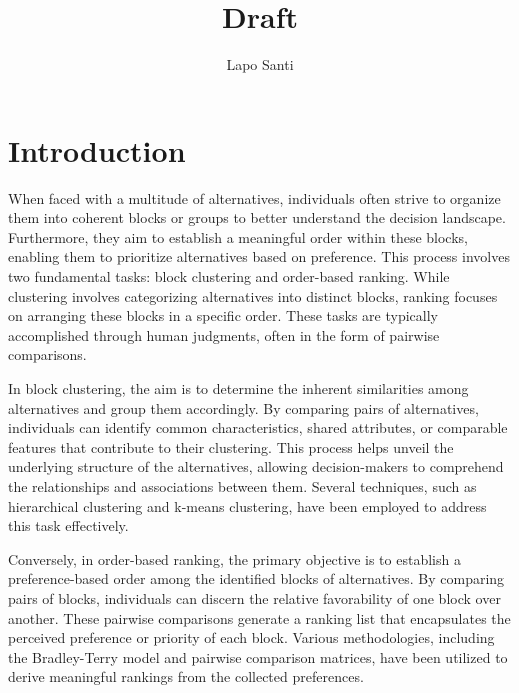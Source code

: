 \documentclass[11pt]{amsart}
\title{Draft}
\author{Lapo Santi}
\begin{document}
\maketitle
\tableofcontents

\newpage

\section{Introduction}



When faced with a multitude of alternatives, individuals often strive to organize them into coherent blocks or groups to better understand the decision landscape. Furthermore, they aim to establish a meaningful order within these blocks, enabling them to prioritize alternatives based on preference. This process involves two fundamental tasks: block clustering and order-based ranking. While clustering involves categorizing alternatives into distinct blocks, ranking focuses on arranging these blocks in a specific order. These tasks are typically accomplished through human judgments, often in the form of pairwise comparisons.

In block clustering, the aim is to determine the inherent similarities among alternatives and group them accordingly. By comparing pairs of alternatives, individuals can identify common characteristics, shared attributes, or comparable features that contribute to their clustering. This process helps unveil the underlying structure of the alternatives, allowing decision-makers to comprehend the relationships and associations between them. Several techniques, such as hierarchical clustering and k-means clustering, have been employed to address this task effectively.

Conversely, in order-based ranking, the primary objective is to establish a preference-based order among the identified blocks of alternatives. By comparing pairs of blocks, individuals can discern the relative favorability of one block over another. These pairwise comparisons generate a ranking list that encapsulates the perceived preference or priority of each block. Various methodologies, including the Bradley-Terry model and pairwise comparison matrices, have been utilized to derive meaningful rankings from the collected preferences.
\end{document}
